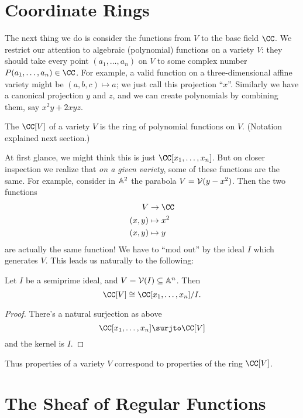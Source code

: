 \section{Coordinate Rings}

The next thing we do is consider the functions from $V$ to the base field $\CC$.
We restrict our attention to algebraic (polynomial) functions on a variety $V$:
they should take every point $(a_1, \dots, a_n)$ on $V$ to some complex number $P(a_1, \dots, a_n) \in \CC$.
For example, a valid function on a three-dimensional affine variety might be $(a,b,c) \mapsto a$;
we just call this projection ``$x$''.
Similarly we have a canonical projection $y$ and $z$,
and we can create polynomials by combining them,
say $x^2y + 2xyz$.

\begin{definition}
	The  $\CC[V]$ of a variety $V$
	is the ring of polynomial functions on $V$.
	(Notation explained next section.)
\end{definition}

At first glance, we might think this is just $\CC[x_1, \dots, x_n]$.
But on closer inspection we realize that \emph{on a given variety},
some of these functions are the same.
For example, consider in $\mathbb A^2$ the parabola $V = \mathcal V(y-x^2)$.
Then the two functions
\begin{align*}
	V & \to \CC \\
	(x,y) & \mapsto x^2 \\
	(x,y) & \mapsto y
\end{align*}
are actually the same function!
We have to ``mod out'' by the ideal $I$ which generates $V$.
This leads us naturally to the following:
\begin{theorem}
	Let $I$ be a semiprime ideal, and $V = \mathcal V(I) \subseteq \mathbb A^n$.
	Then \[ \CC[V] \cong \CC[x_1, \dots, x_n] / I.  \]
\end{theorem}
\begin{proof}
	There's a natural surjection as above
	\[ \CC[x_1, \dots, x_n] \surjto \CC[V] \]
	and the kernel is $I$.
\end{proof}
Thus properties of a variety $V$ correspond to properties of the ring $\CC[V]$.

\section{The Sheaf of Regular Functions}


